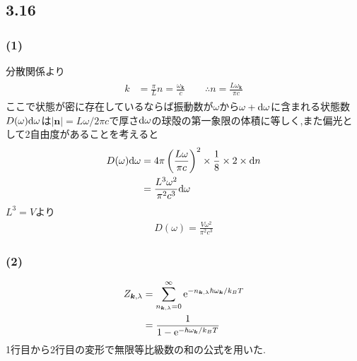 \documentclass[uplatex,a4j,11pt,dvipdfmx]{jsarticle}
\begin{document}
\title{}
\author{61908697 佐々木良輔}
\date{}
\maketitle
\subsection*{3.16}
\subsubsection*{(1)}
分散関係より
\begin{align}
  \begin{split}
    k&=\frac{\pi}{L}n=\frac{\omega_{\bm{k}}}{c}\qquad
    \therefore n=\frac{L\omega_{\bm{k}}}{\pi c}
  \end{split}
\end{align}
ここで状態が密に存在しているならば振動数が$\omega$から$\omega+{\rm d}\omega$に含まれる状態数$D(\omega){\rm d}\omega$は$|\bm{n}|=L\omega/2\pi c$で厚さ${\rm d}\omega$の球殻の第一象限の体積に等しく,また偏光として2自由度があることを考えると
\begin{align}
  \begin{split}
    D(\omega){\rm d}\omega&=4\pi\left(\frac{L\omega}{\pi c}\right)^2\times\frac{1}{8}\times2\times{\rm d}n\\
    &=\frac{L^3\omega^2}{\pi^2c^3}{\rm d}\omega
  \end{split}
\end{align}
$L^3=V$より
\begin{align}
  D(\omega)=\frac{V\omega^2}{\pi^2c^3}
\end{align}
\subsubsection*{(2)}
\begin{align}
  \begin{split}
    Z_{\bm{k},\lambda}&=\sum_{n_{\bm{k},\lambda}=0}^{\infty}{\rm e}^{-n_{\bm{k},\lambda}\hbar\omega_{\bm{k}}/k_BT}\\
    &=\frac{1}{1-{\rm e}^{-\hbar\omega_{\bm{k}}/k_BT}}
  \end{split}
\end{align}
1行目から2行目の変形で無限等比級数の和の公式を用いた.
\end{document}
